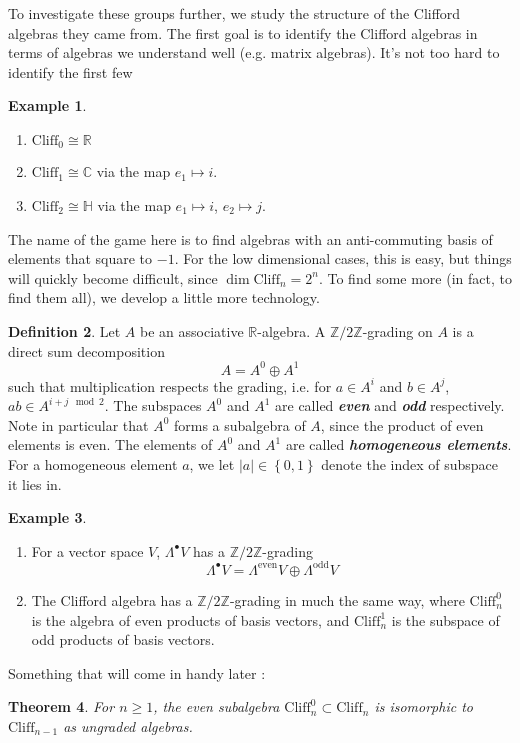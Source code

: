 \documentclass[psamsfonts, 12pt]{amsart}
\newtheorem{thm}{Theorem}[section]
\theoremstyle{definition}
\newtheorem{defn}[thm]{Definition}
\newtheorem{exmp}[thm]{Example}
\theoremstyle{remark}
\newcommand{\R}{\mathbb{R}}
\newcommand{\ib}[1]{\textbf{\textit{#1}}}
\renewcommand{\H}{\mathbb{H}}
\newcommand{\Z}{\mathbb{Z}}
\newcommand{\C}{\mathbb{C}}
\newcommand{\Cliff}{\mathrm{Cliff}}
\newcommand{\set}[1]{\left\lbrace #1 \right\rbrace}
\newcommand{\enumbreak}{\ \\ \vspace{-\baselineskip}}
\begin{document}
To investigate these groups further, we study the structure of the Clifford algebras
they came from. The first goal is to identify the Clifford algebras in terms of
algebras we understand well (e.g. matrix algebras). It's not too hard to
identify the first few
%
\begin{exmp} \enumbreak
\begin{enumerate}
  \item $\Cliff_0 \cong \R$
  \item $\Cliff_1 \cong \C$ via the map $e_1 \mapsto i$.
  \item $\Cliff_2 \cong \H$ via the map $e_1 \mapsto i$, $e_2 \mapsto j$.
\end{enumerate}
\end{exmp}
%
The name of the game here is to find algebras with an anti-commuting basis of elements
that square to $-1$. For the low dimensional cases, this is easy, but things will
quickly become difficult, since $\dim \Cliff_n = 2^n$. To find some more
(in fact, to find them all), we develop a little more technology.
%
\begin{defn}
Let $A$ be an associative $\R$-algebra. A $\Z/2\Z$-grading on $A$ is a direct sum
decomposition
\[
A = A^0 \oplus A^1
\]
such that multiplication respects the grading, i.e. for $a \in A^i$ and $b \in A^j$,
$ab \in A^{i+j \mod 2}$. The subspaces $A^0$ and $A^1$ are called \ib{even} and
\ib{odd} respectively. Note in particular that $A^0$ forms a subalgebra of $A$, since
the product of even elements is even. The elements of $A^0$ and $A^1$ are called
\ib{homogeneous elements}. For a homogeneous element $a$, we let $|a| \in \set{0,1}$
denote the index of subspace it lies in.
\end{defn}
%
\begin{exmp}\enumbreak
\begin{enumerate}
  \item For a vector space $V$, $\Lambda^\bullet V$ has a $\Z/2\Z$-grading
  \[
  \Lambda^\bullet V = \Lambda^{\text{even}}V \oplus \Lambda^{\text{odd}}V
  \]
  \item The Clifford algebra has a $\Z/2\Z$-grading in much the same way, where
  $\Cliff^0_n$ is the algebra of even products of basis vectors, and $\Cliff^1_n$ is the
  subspace of odd products of basis vectors.
\end{enumerate}
\end{exmp}
%
Something that will come in handy later :
%
\begin{thm}
For $n \geq 1$, the even subalgebra $\Cliff^0_n \subset \Cliff_n$ is isomorphic to
$\Cliff_{n-1}$ as ungraded algebras.
\end{thm}
\end{document}
